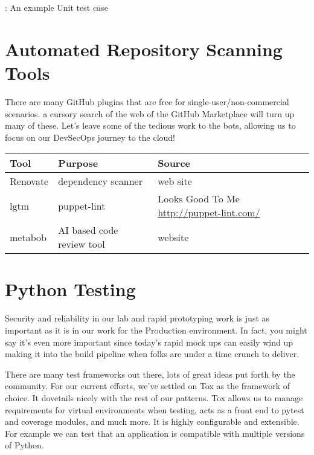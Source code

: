 \begin{mybox}{\thetcbcounter: An example Unit test case}
    
\end{mybox}

\section{Automated Repository Scanning Tools}

\justifying
There are many GitHub plugins that are free for single-user/non-commercial scenarios. a cursory search of the web of the
GitHub Marketplace will turn up many of these. Let's leave some of the
tedious work to the bots, allowing us to focus on our DevSecOps journey to the cloud!

\justifying
\begin{tabular}{| p{2.3cm}| p{4.5cm} | p{8.5cm} |}
    \hline
    \textbf{Tool}& \textbf{Purpose}& \textbf{Source} \\
    \hline
    Renovate & dependency scanner & web site \\
    \hline
    lgtm & puppet-lint & Looks Good To Me \url{http://puppet-lint.com/} \\
    \hline
    metabob & AI based code review tool & website \\
    \hline
\end{tabular}

\section{Python Testing}

\justifying
Security and reliability in our lab and rapid prototyping work is just as important as it is in our work for the Production environment.
In fact, you might say it's even more important since today's rapid mock ups
can easily wind up making it into the build pipeline when folks are under a time crunch to deliver.

\justifying
There are many test frameworks out there, lots of great ideas put forth by the community. For our current
efforts, we've settled on Tox as the framework of choice. It dovetails nicely with the rest of
our patterns. Tox allows us to manage requirements for virtual environments when testing, acts as a front
end to pytest and coverage modules, and much more. It is highly configurable and extensible. For example
we can test that an application is compatible with multiple versions of Python.

